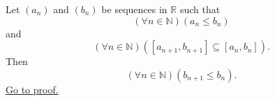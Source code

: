 \begin{lemma}
\label{lem:right-endpoints-nested-intervals-decreasing}
Let $(a_n)$ and $(b_n)$ be sequences in $\mathbb{R}$ such that
\[
  (\forall n\in\mathbb{N})(a_n\leq b_n)
\]
and
\[
  (\forall n\in\mathbb{N})([a_{n+1},b_{n+1}]\subseteq [a_n,b_n]).
\]
Then
\[
  (\forall n\in\mathbb{N})(b_{n+1}\leq b_n).
\]
\hyperref[prf:right-endpoints-nested-intervals-decreasing]{Go to proof.}
\end{lemma}